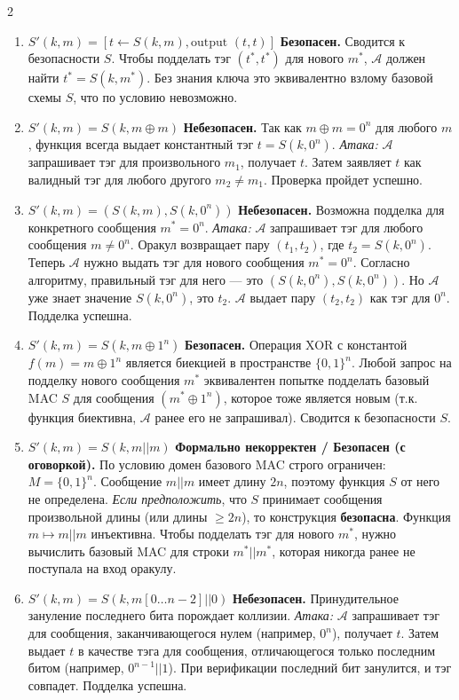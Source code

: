 ﻿\documentclass[10pt,a4paper,landscape]{extarticle}
\begin{document}
\begin{multicols*}{2}
\begin{enumerate}
\def\labelenumi{\arabic{enumi}.}
\item
  \textbf{\(S'(k, m) = [t \leftarrow S(k,m), \text{output } (t, t)]\)} \textbf{Безопасен.} Сводится к безопасности \(S\). Чтобы подделать тэг \((t^*, t^*)\) для нового \(m^*\), \(\mathcal{A}\) должен найти \(t^* = S(k, m^*)\). Без знания ключа это эквивалентно взлому базовой схемы \(S\), что по условию невозможно.
\item
  \textbf{\(S'(k, m) = S(k, m \oplus m)\)} \textbf{Небезопасен.} Так как \(m \oplus m = 0^n\) для любого \(m\), функция всегда выдает константный тэг \(t = S(k, 0^n)\). \emph{Атака:} \(\mathcal{A}\) запрашивает тэг для произвольного \(m_1\), получает \(t\). Затем заявляет \(t\) как валидный тэг для любого другого \(m_2 \neq m_1\). Проверка пройдет успешно.
\item
  \textbf{\(S'(k, m) = (S(k, m), S(k, 0^n))\)} \textbf{Небезопасен.} Возможна подделка для конкретного сообщения \(m^* = 0^n\). \emph{Атака:} \(\mathcal{A}\) запрашивает тэг для любого сообщения \(m \neq 0^n\). Оракул возвращает пару \((t_1, t_2)\), где \(t_2 = S(k, 0^n)\). Теперь \(\mathcal{A}\) нужно выдать тэг для нового сообщения \(m^* = 0^n\). Согласно алгоритму, правильный тэг для него --- это \((S(k, 0^n), S(k, 0^n))\). Но \(\mathcal{A}\) уже знает значение \(S(k, 0^n)\), это \(t_2\). \(\mathcal{A}\) выдает пару \((t_2, t_2)\) как тэг для \(0^n\). Подделка успешна.
\item
  \textbf{\(S'(k, m) = S(k, m \oplus 1^n)\)} \textbf{Безопасен.} Операция XOR с константой \(f(m) = m \oplus 1^n\) является биекцией в пространстве \(\{0,1\}^n\). Любой запрос на подделку нового сообщения \(m^*\) эквивалентен попытке подделать базовый MAC \(S\) для сообщения \((m^* \oplus 1^n)\), которое тоже является новым (т.к. функция биективна, \(\mathcal{A}\) ранее его не запрашивал). Сводится к безопасности \(S\).
\item
  \textbf{\(S'(k, m) = S(k, m || m)\)} \textbf{Формально некорректен / Безопасен (с оговоркой).} По условию домен базового MAC строго ограничен: \(M=\{0,1\}^n\). Сообщение \(m||m\) имеет длину \(2n\), поэтому функция \(S\) от него не определена. \emph{Если предположить}, что \(S\) принимает сообщения произвольной длины (или длины \(\ge 2n\)), то конструкция \textbf{безопасна}. Функция \(m \mapsto m||m\) инъективна. Чтобы подделать тэг для нового \(m^*\), нужно вычислить базовый MAC для строки \(m^* || m^*\), которая никогда ранее не поступала на вход оракулу.
\item
  \textbf{\(S'(k, m) = S(k, m[0\dots n-2] || 0)\)} \textbf{Небезопасен.} Принудительное зануление последнего бита порождает коллизии. \emph{Атака:} \(\mathcal{A}\) запрашивает тэг для сообщения, заканчивающегося нулем (например, \(0^n\)), получает \(t\). Затем выдает \(t\) в качестве тэга для сообщения, отличающегося только последним битом (например, \(0^{n-1}||1\)). При верификации последний бит занулится, и тэг совпадет. Подделка успешна.
\end{enumerate}


\end{multicols*}
\end{document}
